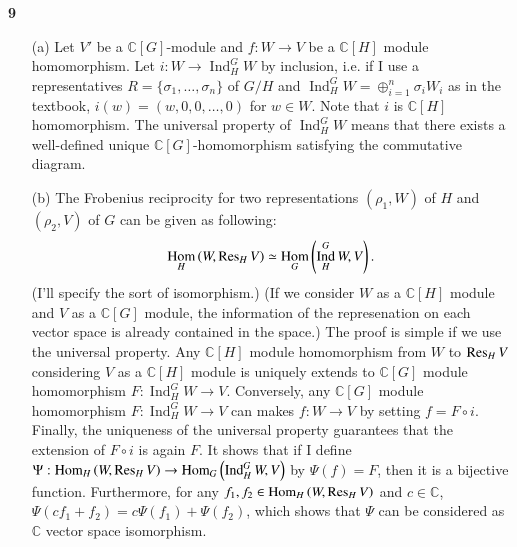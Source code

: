 \documentclass[a4paper, 12pt]{article}
\theoremstyle{Mydefinition}
\theoremstyle{Mytheorem}
\DeclareMathOperator{\Ind}{Ind}
\DeclareMathOperator{\Hom}{Hom}
\begin{document}
\noindent \textbf{9}
\begin{enumerate}
    \item[(a)] Let $V'$ be a $\mathbb{C}[G]$-module and $f:W\rightarrow V$ be a $\mathbb{C}[H]$ module homomorphism. Let $i:W\rightarrow \Ind_H^G W$ by inclusion, i.e. if I use a representatives $R = \{\sigma_1, \ldots, \sigma_n\}$ of $G/H$ and $\Ind_H^G W = \oplus_{i=1}^n \sigma_iW_i$ as in the textbook, $i(w) = (w,0,0,\ldots, 0)$ for $w\in W$. Note that $i$ is $\mathbb{C}[H]$ homomorphism. The universal property of $\Ind_H^G W$ means that there exists a well-defined unique $\mathbb{C}[G]$-homomorphism satisfying the commutative diagram.
    \begin{figure}[h]
        \centering
    \end{figure}
    \item[(b)] The Frobenius reciprocity for two representations $(\rho_1, W)$ of $H$ and $(\rho_2, V)$ of $G$ can be given as following:
    \begin{equation}
        \Hom_H\left(W, \Res_H V\right) \simeq \Hom_G\left(\Ind_H^G W, V\right).
    \end{equation}
    (I'll specify the sort of isomorphism.) (If we consider $W$ as a $\mathbb{C}[H]$ module and $V$ as a $\mathbb{C}[G]$ module, the information of the represenation on each vector space is already contained in the space.)
    The proof is simple if we use the universal property. Any $\mathbb{C}[H]$ module homomorphism from $W$ to $\Res_H V$ considering $V$ as a $\mathbb{C}[H]$ module is uniquely extends to $\mathbb{C}[G]$ module homomorphism $F:\Ind_H^G W\rightarrow V$. Conversely, any $\mathbb{C}[G]$ module homomorphism $F:\Ind_H^G W\rightarrow V$ can makes $f:W\rightarrow V$ by setting $f = F\circ i$. Finally, the uniqueness of the universal property guarantees that the extension of $F\circ i$ is again $F$. It shows that if I define $\Psi:\Hom_H\left(W, \Res_H V\right)\rightarrow \Hom_G\left(\Ind_H^G W, V\right)$ by $\Psi(f) = F$, then it is a bijective function. Furthermore, for any $f_1,f_2\in \Hom_H\left(W, \Res_H V\right)$ and $c\in \mathbb{C}$, $\Psi(cf_1+f_2) = c\Psi(f_1)+\Psi(f_2)$, which shows that $\Psi$ can be considered as $\mathbb{C}$ vector space isomorphism.
\end{enumerate}
\end{document}
